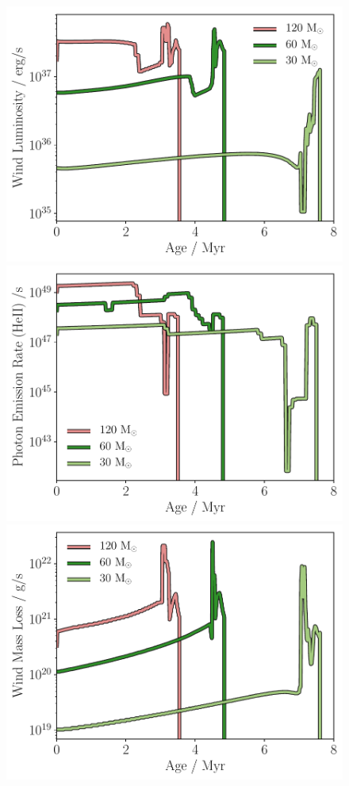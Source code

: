 \documentclass[a4paper,fleqn,usenatbib]{mnras}
\begin{document}
\begin{figure}
	\includegraphics[width=1\columnwidth]{../plots/stellarevolution_windlum.pdf}
	\includegraphics[width=1\columnwidth]{../plots/stellarevolution_photoHeII.pdf}
	\includegraphics[width=1\columnwidth]{../plots/stellarevolution_windmassloss.pdf}

\end{figure}
\end{document}
